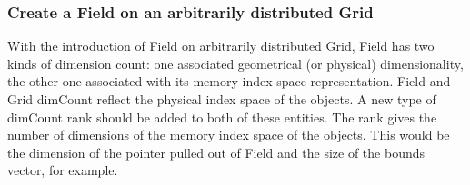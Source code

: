  
\setlength{\oldparskip}{\parskip}
\setlength{\parskip}{1.5ex}
\setlength{\oldparindent}{\parindent}
\setlength{\parindent}{0pt}
\setlength{\oldbaselineskip}{\baselineskip}
\setlength{\baselineskip}{11pt}
 
\def\bv{\begin{verbatim}}
\def\ev{\end{verbatim}}
\def\be{\begin{equation}}
\def\ee{\end{equation}}
\def\bea{\begin{eqnarray}}
\def\eea{\end{eqnarray}}
\def\bi{\begin{itemize}}
\def\ei{\end{itemize}}
\def\bn{\begin{enumerate}}
\def\en{\end{enumerate}}
\def\bd{\begin{description}}
\def\ed{\end{description}}
\def\({\left (}
\def\){\right )}
\def\[{\left [}
\def\]{\right ]}
\def\<{\left  \langle}
\def\>{\right \rangle}
\def\cI{{\cal I}}
\def\diag{\mathop{\rm diag}}
\def\tr{\mathop{\rm tr}}


 

  \subsubsection{Create a Field on an arbitrarily distributed Grid}
  \label{sec:field:usage:createArbGrid}
  
    With the introduction of Field on arbitrarily distributed Grid, Field has two kinds of dimension
    count: one associated geometrical (or physical) dimensionality, the other one associated with its
    memory index space representation. Field and Grid dimCount reflect the physical index 
    space of the objects. A new type of dimCount rank should be added to both of these entities.
    The rank gives the number of dimensions of the memory index space of the objects.
    This would be the dimension of the pointer pulled out of Field and the
    size of the bounds vector, for example. 
  
